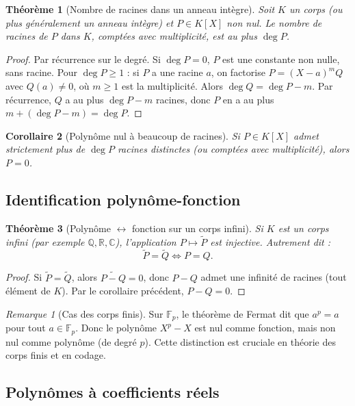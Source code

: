\documentclass[12pt,a4paper]{report}
\newtheorem{theoreme}{Théorème}[section]
\newtheorem{corollaire}[theoreme]{Corollaire}
\theoremstyle{definition}
\theoremstyle{remark}
\newtheorem{remarque}{Remarque}[section]
\begin{document}
\begin{theoreme}[Nombre de racines dans un anneau intègre]
Soit $K$ un corps (ou plus généralement un anneau intègre) et $P \in K[X]$ non nul. Le nombre de racines de $P$ dans $K$, comptées avec multiplicité, est au plus $\deg P$.
\end{theoreme}

\begin{proof}
Par récurrence sur le degré. Si $\deg P = 0$, $P$ est une constante non nulle, sans racine. Pour $\deg P \ge 1$ : si $P$ a une racine $a$, on factorise $P = (X - a)^m Q$ avec $Q(a) \neq 0$, où $m \ge 1$ est la multiplicité. Alors $\deg Q = \deg P - m$. Par récurrence, $Q$ a au plus $\deg P - m$ racines, donc $P$ en a au plus $m + (\deg P - m) = \deg P$.
\end{proof}

\begin{corollaire}[Polynôme nul à beaucoup de racines]
Si $P \in K[X]$ admet strictement plus de $\deg P$ racines distinctes (ou comptées avec multiplicité), alors $P = 0$.
\end{corollaire}

\subsection{Identification polynôme-fonction}

\begin{theoreme}[Polynôme $\leftrightarrow$ fonction sur un corps infini]
Si $K$ est un corps infini (par exemple $\mathbb{Q}, \mathbb{R}, \mathbb{C}$), l'application $P \mapsto \widetilde{P}$ est injective. Autrement dit :
\[ \widetilde{P} = \widetilde{Q} \iff P = Q. \]
\end{theoreme}

\begin{proof}
Si $\widetilde{P} = \widetilde{Q}$, alors $\widetilde{P - Q} = 0$, donc $P - Q$ admet une infinité de racines (tout élément de $K$). Par le corollaire précédent, $P - Q = 0$.
\end{proof}

\begin{remarque}[Cas des corps finis]
Sur $\mathbb{F}_p$, le théorème de Fermat dit que $a^p = a$ pour tout $a \in \mathbb{F}_p$. Donc le polynôme $X^p - X$ est nul comme fonction, mais non nul comme polynôme (de degré $p$). Cette distinction est cruciale en théorie des corps finis et en codage.
\end{remarque}

\subsection{Polynômes à coefficients réels}
\end{document}
